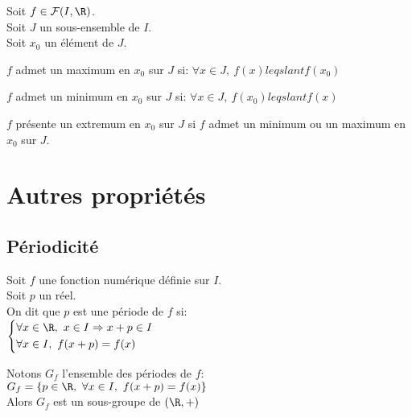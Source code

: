 \documentclass[12pt,twoside,a4paper]{article}
\begin{document}
		\begin{defi}
			Soit $f\in \mathcal{F}(I,\R)$.\\
			Soit $J$ un sous-ensemble de $I$.\\
			Soit $x_0$ un \'el\'ement de $J$.
			\begin{liste}
				\item $f$ admet un maximum en $x_0$ sur $J$ si: $\forall x\in J,\ f(x)leqslant f(x_0)$
				\item $f$ admet un minimum en $x_0$ sur $J$ si: $\forall x\in J,\ f(x_0)leqslant f(x)$
				\item $f$ pr\'esente un extremum en $x_0$ sur $J$ si $f$ admet un minimum ou un maximum en $x_0$ sur $J$.
			\end{liste}
		\end{defi}
	\section{Autres propri\'et\'es}
		\subsection{P\'eriodicit\'e}
			\begin{defi}
				Soit $f$ une fonction num\'erique d\'efinie sur $I$.\\
				Soit $p$ un r\'eel.\\
				On dit que $p$ est une p\'eriode de $f$ si:\\
				$\left\{\begin{aligned}
				&\forall x\in \R,\ x\in I\Rightarrow x+p\in I\\
				&\forall x\in I,\ f(x+p)=f(x)
				\end{aligned} \right.$
			\end{defi}
			\begin{flushleft}
				Notons $G_f$ l'ensemble des p\'eriodes de $f$:\\
				$G_f=\{p\in\R,\ \forall x\in I,\ f(x+p)=f(x) \}$\\
				Alors $G_f$ est un sous-groupe de $(\R,+)$
			\end{flushleft}
\end{document}
